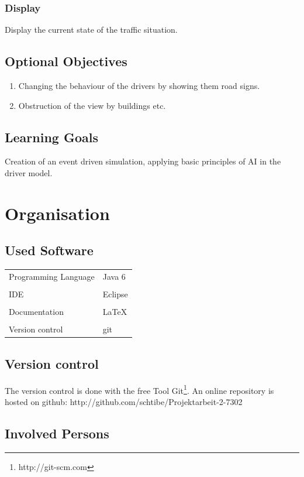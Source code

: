 \documentclass[a4paper,10pt,titlepage]{article}
\begin{document}
\subsubsection{Display}

Display the current state of the traffic situation. 
\newpage

\subsection{Optional Objectives}
\begin{enumerate}
 \item Changing the behaviour of the drivers by showing them road signs. 
 \item Obstruction of the view by buildings etc. 
\end{enumerate}
\subsection{Learning Goals}
Creation of an event driven simulation, applying basic principles of AI in the driver model.


\section{Organisation}

\subsection{Used Software}
\begin{tabular}{ll}
Programming Language & Java 6 \\
& \\
IDE & Eclipse \\
& \\
Documentation & \LaTeX \\
& \\
Version control & git \\
\end{tabular}

\subsection{Version control}
The version control is done with the free Tool Git\footnote[1]{http://git-scm.com}.
An online repository is hosted on github: \newline
http://github.com/schtibe/Projektarbeit-2-7302


\subsection{Involved Persons}
\end{document}
